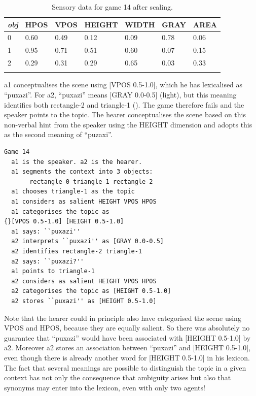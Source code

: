 \begin{table}
\begin{center}
\begin{tabular}{ l  l  l  l  l  l  l }
\lsptoprule
{\itshape obj} & HPOS & VPOS & HEIGHT & WIDTH & GRAY & AREA \\ \midrule
0 & 0.60 & 0.49 & 0.12 & 0.09 & 0.78 & 0.06\\ 
1 & 0.95 & 0.71 & 0.51 & 0.60 & 0.07 & 0.15\\ 
2 & 0.29 & 0.31 & 0.29 & 0.65 & 0.03 & 0.33\\ 
\lspbottomrule
\end{tabular}
\caption{\label{tab:game14} Sensory data for game 14 after scaling.}
\end{center}
\end{table}

{\bfshape  a1} conceptualises the scene using 
{}[VPOS 0.5-1.0], which he has lexicalised as ``puxazi''. 
For {\bfshape  a2}, ``puxazi'' means [GRAY 0.0-0.5] (light), but this 
meaning identifies both rectangle-2 and
triangle-1 (). The game therefore
fails and the speaker points to the topic. The hearer
conceptualises the scene based on this non-verbal
hint from the speaker using the HEIGHT dimension and adopts this as the second meaning 
of ``puzaxi''. 
\begin{verbatim}
Game 14
  a1 is the speaker. a2 is the hearer. 
  a1 segments the context into 3 objects: 
       rectangle-0 triangle-1 rectangle-2
  a1 chooses triangle-1 as the topic 
  a1 considers as salient HEIGHT VPOS HPOS 
  a1 categorises the topic as 
{}[VPOS 0.5-1.0] [HEIGHT 0.5-1.0]
  a1 says: ``puxazi''
  a2 interprets ``puxazi'' as [GRAY 0.0-0.5]
  a2 identifies rectangle-2 triangle-1
  a2 says: ``puxazi?''
  a1 points to triangle-1
  a2 considers as salient HEIGHT VPOS HPOS 
  a2 categorises the topic as [HEIGHT 0.5-1.0]
  a2 stores ``puxazi'' as [HEIGHT 0.5-1.0]
\end{verbatim}
Note that the hearer could in principle 
also have categorised the
scene using VPOS and HPOS, because they are
equally salient. So there was absolutely no 
guarantee that ``puxazi'' would have been associated 
with [HEIGHT 0.5-1.0] by {\bfshape  a2}. Moreover {\bfshape  a2} stores
an association between ``puxazi'' and [HEIGHT 0.5-1.0], even though 
there is already another word for 
{}[HEIGHT 0.5-1.0] in his lexicon. The fact that 
several meanings are possible to distinguish the topic in a given 
context has not only the consequence that ambiguity
arises but also that synonyms may enter into the lexicon, 
even with only two agents!


